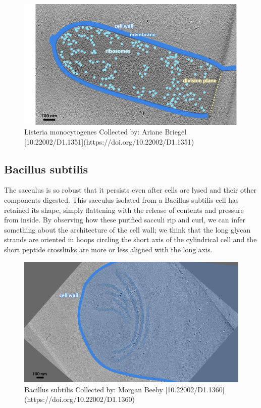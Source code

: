 \documentclass[]{tufte-book}
\begin{document}
\begin{figure}
\includegraphics{img/2_2_Lmonocytogenes} \caption[Listeria monocytogenes Collected by]{Listeria monocytogenes Collected by: Ariane Briegel [10.22002/D1.1351](https://doi.org/10.22002/D1.1351)}\label{fig:unnamed-chunk-4}
\end{figure}

\hypertarget{Peptidoglycan_architecture}{\subsection{Bacillus
subtilis}\label{Peptidoglycan_architecture}}

The sacculus is so robust that it persists even after cells are lysed
and their other components digested. This sacculus isolated from a
Bacillus subtilis cell has retained its shape, simply flattening with
the release of contents and pressure from inside. By observing how these
purified sacculi rip and curl, we can infer something about the
architecture of the cell wall; we think that the long glycan strands are
oriented in hoops circling the short axis of the cylindrical cell and
the short peptide crosslinks are more or less aligned with the long
axis.

\begin{figure}
\includegraphics{img/2_2a_Bsubtilis} \caption[Bacillus subtilis Collected by]{Bacillus subtilis Collected by: Morgan Beeby [10.22002/D1.1360](https://doi.org/10.22002/D1.1360)}\label{fig:unnamed-chunk-5}
\end{figure}
\end{document}
